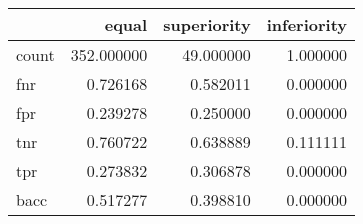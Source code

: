 \begin{tabular}{lrrr}
\toprule
{} &       equal &  superiority &  inferiority \\
\midrule
count &  352.000000 &    49.000000 &     1.000000 \\
fnr   &    0.726168 &     0.582011 &     0.000000 \\
fpr   &    0.239278 &     0.250000 &     0.000000 \\
tnr   &    0.760722 &     0.638889 &     0.111111 \\
tpr   &    0.273832 &     0.306878 &     0.000000 \\
bacc  &    0.517277 &     0.398810 &     0.000000 \\
\bottomrule
\end{tabular}
